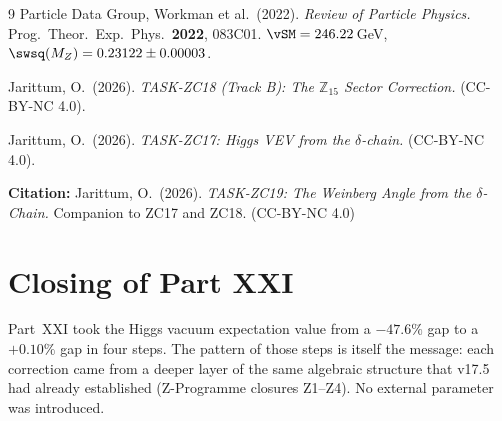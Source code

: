 \documentclass[12pt, a4paper]{article}
\begin{document}
\bigskip
\begin{thebibliography}{9}
  Particle Data Group, Workman et al.\ (2022).
  \textit{Review of Particle Physics.}
  Prog.\ Theor.\ Exp.\ Phys.\ \textbf{2022}, 083C01.
  $\vSM = 246.22$\,GeV, $\swsq(M_Z)=0.23122\pm0.00003$.

  Jarittum, O.\ (2026).
  \textit{TASK-ZC18 (Track B): The $\mathbb{Z}_{15}$ Sector Correction.}
  (CC-BY-NC 4.0).

  Jarittum, O.\ (2026).
  \textit{TASK-ZC17: Higgs VEV from the $\delta$-chain.}
  (CC-BY-NC 4.0).
\end{thebibliography}

\bigskip
\begin{center}
\textbf{Citation:} Jarittum, O.\ (2026).
\textit{TASK-ZC19: The Weinberg Angle from the $\delta$-Chain.}
Companion to ZC17 and ZC18. (CC-BY-NC 4.0)
\end{center}

\bigskip


\section*{Closing of Part XXI}

Part~XXI took the Higgs vacuum expectation value from a $-47.6\%$
gap to a $+0.10\%$ gap in four steps. The pattern of those steps
is itself the message: each correction came from a deeper layer of
the same algebraic structure that v17.5 had already established
(Z-Programme closures Z1--Z4). No external parameter was introduced.
\end{document}

